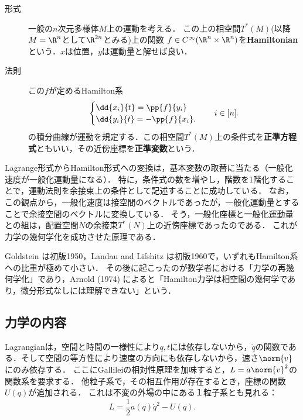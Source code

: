 \documentclass[uplatex,dvipdfmx]{jsreport}
\begin{document}
\begin{model}[Hamilton形式]\mbox{}
    \begin{description}
        \item[形式] 一般の$n$次元多様体$M$上の運動を考える．
        この上の相空間$T^*(M)$(以降$M=\R^n$として$\R^{2n}$とみる)上の関数
        $f\in C^\infty(\R^n\times\R^n)$を\textbf{Hamiltonian}という．$x$は位置，$y$は運動量と解せば良い．
        \item[法則] この$f$が定めるHamilton系
        \[\begin{cases}
            \dd{x_i}{t}=\pp{f}{y_i}\\
            \dd{y_i}{t}=-\pp{f}{x_i}.
        \end{cases}\quad i\in[n].\]
        の積分曲線が運動を規定する．この相空間$T^*(M)$上の条件式を\textbf{正準方程式}ともいい，その近傍座標を\textbf{正準変数}という．
    \end{description}
\end{model}

\begin{remarks}
    Lagrange形式からHamilton形式への変換は，基本変数の取替に当たる（一般化速度が一般化運動量になる）．
    特に，条件式の数を増やし，階数を1階化することで，運動法則を余接束上の条件として記述することに成功している．
    なお，この観点から，一般化速度は接空間のベクトルであったが，一般化運動量とすることで余接空間のベクトルに変換している．
    そう，一般化座標と一般化運動量との組は，配置空間$N$の余接束$T^*(N)$上の近傍座標であったのである．
    これが力学の幾何学化を成功させた原理である．
\end{remarks}

\begin{history}
    Goldstein \cite{Goldstein}は初版1950，Landau and Lifshitz \cite{Landau}は初版1960で，いずれもHamilton系への比重が極めて小さい．
    その後に起こったのが数学者における「力学の再幾何学化」であり，Arnold (1974) によると「Hamilton力学は相空間の幾何学であり，微分形式なしには理解できない」という．
\end{history}

\subsection{力学の内容}

\begin{observation}[Lagrangianの形の決定]
    Lagrangianは，空間と時間の一様性により$q,t$には依存しないから，$\dot{q}$の関数である．そして空間の等方性により速度の方向にも依存しないから，速さ$\norm{v}$にのみ依存する．
    ここにGallileiの相対性原理を加味すると，$L=a\norm{v}^2$の関数系を要求する．
    他粒子系で，その相互作用が存在するとき，座標の関数$U(q)$が追加される．
    これは不変の外場の中にある１粒子系とも見れる：
    \[L=\frac{1}{2}a(q)\dot{q}^2-U(q).\]
\end{observation}
\end{document}

